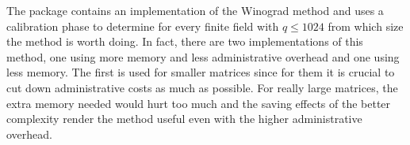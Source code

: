 % 
% 
% 
% 
% 
% 
% 
The {\cvec} package
contains an implementation of the Winograd method and uses a calibration
%
%
phase to determine for every finite field with $q \le 1024$ from which
size the method is worth doing. In fact, there are two implementations
of this method, one using more memory and less administrative overhead
and one using less memory. The first is used for smaller matrices since
for them it is crucial to cut down administrative costs as much as
possible. For really large matrices, the extra memory needed would hurt
too much and the saving effects of the better complexity render the
method useful even with the higher administrative overhead.


